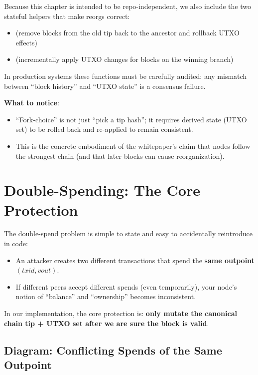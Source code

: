 Because this chapter is intended to be repo-independent, we also include the two stateful helpers that make reorgs correct:

\begin{itemize}
  \item {} (remove blocks from the old tip back to the ancestor and rollback UTXO effects)
  \item {} (incrementally apply UTXO changes for blocks on the winning branch)
\end{itemize}

In production systems these functions must be carefully audited: any mismatch between ``block history'' and ``UTXO state'' is a consensus failure.

\textbf{What to notice}:
\begin{itemize}
  \item ``Fork-choice'' is not just ``pick a tip hash''; it requires derived state (UTXO set) to be rolled back and re-applied to remain consistent.
  \item This is the concrete embodiment of the whitepaper's claim that nodes follow the strongest chain (and that later blocks can cause reorganization).
\end{itemize}

\section{Double-Spending: The Core Protection}
\label{sec:ch09-7-doublespend}

The double-spend problem is simple to state and easy to accidentally reintroduce in code:

\begin{itemize}
  \item An attacker creates two different transactions that spend the \textbf{same outpoint} $(txid, vout)$.
  \item If different peers accept different spends (even temporarily), your node's notion of ``balance'' and ``ownership'' becomes inconsistent.
\end{itemize}

In our implementation, the core protection is: \textbf{only mutate the canonical chain tip + UTXO set after we are sure the block is valid}.

\subsection{Diagram: Conflicting Spends of the Same Outpoint}
\label{sec:ch09-7-conflict}

